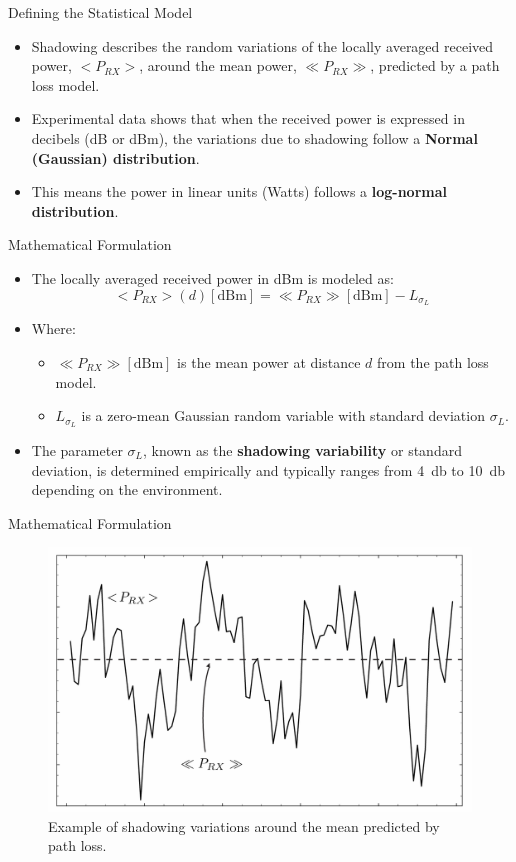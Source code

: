 \documentclass{beamer}
\begin{document}
	\begin{frame}{Defining the Statistical Model}
		\begin{itemize}
			\item Shadowing describes the random variations of the locally averaged received power, $<P_{RX}>$, around the mean power, $\ll P_{RX} \gg$, predicted by a path loss model.
			\item Experimental data shows that when the received power is expressed in decibels (dB or dBm), the variations due to shadowing follow a \textbf{Normal (Gaussian) distribution}.
			\item This means the power in linear units (Watts) follows a \textbf{log-normal distribution}.
		\end{itemize}
	\end{frame}
	
	\begin{frame}{Mathematical Formulation}
		\begin{itemize}
			\item The locally averaged received power in dBm is modeled as:
			\[
			<P_{RX}>(d)[\text{dBm}] = \ll P_{RX} \gg[\text{dBm}] - L_{\sigma_L}
			\]
			\item Where:
			\begin{itemize}
				\item $\ll P_{RX} \gg[\text{dBm}]$ is the mean power at distance $d$ from the path loss model.
				\item $L_{\sigma_L}$ is a zero-mean Gaussian random variable with standard deviation $\sigma_L$.
			\end{itemize}
			\item The parameter $\sigma_L$, known as the \textbf{shadowing variability} or standard deviation, is determined empirically and typically ranges from \SI{4}{\decibel} to \SI{10}{\decibel} depending on the environment.
		\end{itemize}
	\end{frame}
	
	\begin{frame}{Mathematical Formulation}
		\begin{figure}
			\centering
			\includegraphics[width=0.7\linewidth]{"pictures/shadowing-variations.png"}
			\caption{Example of shadowing variations around the mean predicted by path loss.}
		\end{figure}
	\end{frame}
	
\end{document}
